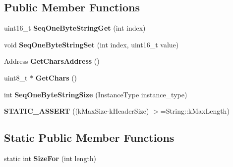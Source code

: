 \subsection*{Public Member Functions}
\begin{DoxyCompactItemize}
\item 
\hypertarget{classv8_1_1internal_1_1_seq_one_byte_string_aaa3a16437c74c545b56f8779b2eaf15e}{}uint16\+\_\+t {\bfseries Seq\+One\+Byte\+String\+Get} (int index)\label{classv8_1_1internal_1_1_seq_one_byte_string_aaa3a16437c74c545b56f8779b2eaf15e}

\item 
\hypertarget{classv8_1_1internal_1_1_seq_one_byte_string_ace86c2c7439753b6bb6cb9a370c4ca2e}{}void {\bfseries Seq\+One\+Byte\+String\+Set} (int index, uint16\+\_\+t value)\label{classv8_1_1internal_1_1_seq_one_byte_string_ace86c2c7439753b6bb6cb9a370c4ca2e}

\item 
\hypertarget{classv8_1_1internal_1_1_seq_one_byte_string_aa393da023be3fd046b02c0ee11aa25db}{}Address {\bfseries Get\+Chars\+Address} ()\label{classv8_1_1internal_1_1_seq_one_byte_string_aa393da023be3fd046b02c0ee11aa25db}

\item 
\hypertarget{classv8_1_1internal_1_1_seq_one_byte_string_a1a46b1bf7e4321041b3b4b33bb9d2b94}{}uint8\+\_\+t $\ast$ {\bfseries Get\+Chars} ()\label{classv8_1_1internal_1_1_seq_one_byte_string_a1a46b1bf7e4321041b3b4b33bb9d2b94}

\item 
\hypertarget{classv8_1_1internal_1_1_seq_one_byte_string_aa9fa09a5fbd9160f053ba6c0edbd10c2}{}int {\bfseries Seq\+One\+Byte\+String\+Size} (Instance\+Type instance\+\_\+type)\label{classv8_1_1internal_1_1_seq_one_byte_string_aa9fa09a5fbd9160f053ba6c0edbd10c2}

\item 
\hypertarget{classv8_1_1internal_1_1_seq_one_byte_string_a1297a6eb07f2b9b66d9235769dd6e947}{}{\bfseries S\+T\+A\+T\+I\+C\+\_\+\+A\+S\+S\+E\+R\+T} ((k\+Max\+Size-\/k\+Header\+Size) $>$=String\+::k\+Max\+Length)\label{classv8_1_1internal_1_1_seq_one_byte_string_a1297a6eb07f2b9b66d9235769dd6e947}

\end{DoxyCompactItemize}
\subsection*{Static Public Member Functions}
\begin{DoxyCompactItemize}
\item 
\hypertarget{classv8_1_1internal_1_1_seq_one_byte_string_a8c149d283d3bc8e22fd909bb6687da7f}{}static int {\bfseries Size\+For} (int length)\label{classv8_1_1internal_1_1_seq_one_byte_string_a8c149d283d3bc8e22fd909bb6687da7f}

\end{DoxyCompactItemize}

